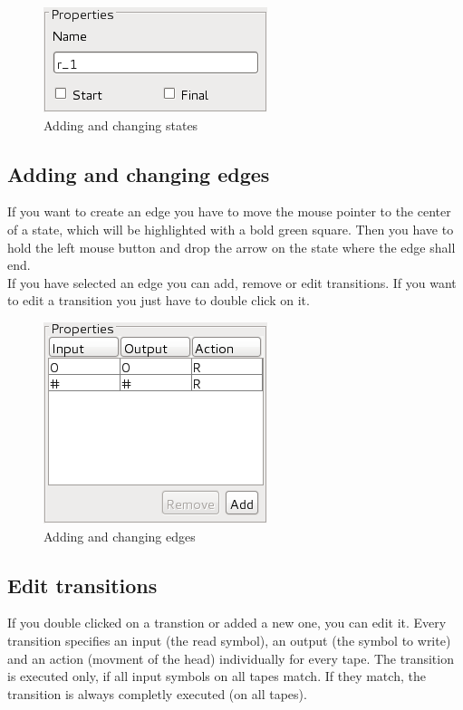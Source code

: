 \documentclass[%
  a4paper,%
  11pt,%
  blue,%
  hyperref	%
  ]{tubsartcl}
\begin{document}
\begin{figure}[!htb]
\begin{center}
\includegraphics[scale=0.5]{graphics_gui/state_properties.png}
\end{center}
\caption{Adding and changing states}
\label{pic:state_properties}
\end{figure}

\clearpage

\subsection{Adding and changing edges}
\label{sec:adding-chang-edges}
If you want to create an edge you have to move the mouse pointer to the center of a state, which will be highlighted with a bold green square. Then you have to hold the left mouse button and drop the arrow on the state where the edge shall end. \\
If you have selected an edge you can add, remove or edit transitions. If you want to edit a transition you just have to double click on it.
\begin{figure}[!htb]
\begin{center}
\includegraphics[scale=0.5]{graphics_gui/edge_properties.png}
\end{center}
\caption{Adding and changing edges}
\label{pic:edge_properties}
\end{figure}

\subsection{Edit transitions}
\label{sec:edit-transitions}
If you double clicked on a transtion or added a new one, you can edit it. Every transition specifies an input (the read symbol), an output (the symbol to write) and an action (movment of the head) individually for every tape. The transition is executed only, if all input symbols on all tapes match. If they match, the transition is always completly executed (on all tapes).
\bigskip
\end{document}
